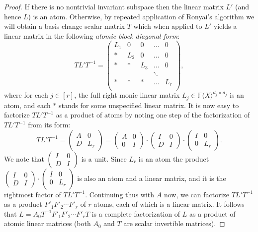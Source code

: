 \documentclass[10pt,a4paper]{article}
\newcommand{\F}{\mathbb{F}}
\renewcommand{\angle}[1]{\langle #1 \rangle}
\newcommand{\FX}{\F\angle{X}}
\newcommand{\fR}{\FX}
\begin{document}
\begin{proof}
If there is no nontrivial invariant
subspace then the linear matrix $L'$ (and hence $L$) is an
atom. 
Otherwise, by repeated application of Ronyai's algorithm we will
obtain a basis change scalar matrix $T$ which when applied to $L'$
yields a linear matrix in the following \emph{atomic block diagonal
  form}:
\begin{equation}\label{eq3}
TL' T^{-1} = 
\left(
\begin{array}{ccccc}
L_1 & 0 &0 &\ldots & 0\\
* & L_2 &0 &\ldots & 0\\
* & * &L_3 &\ldots & 0\\
& & &\ddots &\\
* & * &* &\ldots & L_r\\
\end{array}
\right),
\end{equation}
where for each $j\in[r]$, the full right monic linear matrix $L_j \in \fR^{d_j \times
  d_j}$ is an atom, and each $*$ stands for some unspecified linear
matrix. It is now easy to factorize $TL'T^{-1}$ as a product of atoms
by noting one step of the factorization of $TL'T^{-1}$ from its form:
\[
TL'T^{-1}=  \left(
\begin{array}{cc}
A & 0 \\
D & L_r
\end{array}
\right) =   \left(
\begin{array}{cc}
A & 0 \\
0 & I
\end{array}
\right)\cdot 
  \left(
\begin{array}{cc}
I & 0 \\
D & I
\end{array}
\right)\cdot
\left(
\begin{array}{cc}
I & 0 \\
0 & L_r
\end{array}
\right).
\]
We note that  $\left(
\begin{array}{cc}
I & 0 \\
D & I
\end{array}
\right)$ is a unit. Since $L_r$ is an atom the product $\left(
\begin{array}{cc}
I & 0 \\
D & I
\end{array}
\right)\cdot \left(
\begin{array}{cc}
I & 0 \\
0 & L_r
\end{array}
\right)$ is also an atom and a linear matrix, and it is the rightmost
factor of $TL'T^{-1}$. Continuing thus with $A$ now, we can factorize
$TL'T^{-1}$ as a product $F'_1F'_2\cdots F'_r$ of $r$ atoms, each of
which is a linear matrix. It follows that $L=A_0T^{-1}F'_1F'_2\cdots
F'_rT$ is a complete factorization of $L$ as a product of atomic
linear matrices (both $A_0$ and $T$ are scalar invertible matrices).
\end{proof}
\end{document}
